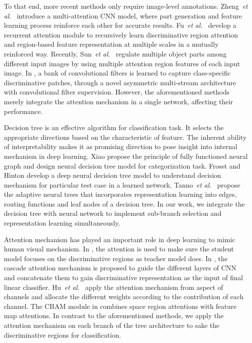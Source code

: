 \documentclass[10pt,twocolumn,letterpaper]{article}
\def\etal{{\em et al.}}
\begin{document}
{} To that end, more recent methods \cite{DBLP:conf/iccv/ZhengFML17,DBLP:conf/cvpr/FuZM17,DBLP:conf/eccv/SunYZD18,DBLP:conf/cvpr/WangMD18} only require image-level annotations. Zheng~\etal~\cite{DBLP:conf/iccv/ZhengFML17} introduce a multi-attention CNN model, where part generation and feature learning process reinforce each other for accurate results. Fu~\etal~\cite{DBLP:conf/cvpr/FuZM17} develop a recurrent attention module to recursively learn discriminative region attention and region-based feature representation at multiple scales in a mutually reinforced way. Recently, Sun~\etal~\cite{DBLP:conf/eccv/SunYZD18} regulate multiple object parts among different input images by using multiple attention region features of each input image. In \cite{DBLP:conf/cvpr/WangMD18}, a bank of convolutional filters is learned to capture class-specific discriminative patches, through a novel asymmetric multi-stream architecture with convolutional filter supervision. However, the aforementioned methods merely integrate the attention mechanism in a single network, affecting their performance.

{} Decision tree is an effective algorithm for classification task. It selects the appropriate directions based on the characteristic of feature. The inherent ability of interpretability makes it as promising direction to pose insight into internal mechanism in deep learning. Xiao \cite{DBLP:journals/corr/abs-1712-05934} propose the principle of fully functioned neural graph and design neural decision tree model for categorization task. Frosst and Hinton \cite{DBLP:journals/corr/abs-1711-09784} develop a deep neural decision tree model to understand decision mechanism for particular test case in a learned network. Tanno~\etal~\cite{DBLP:conf/icml/TannoAACN19} propose the adaptive neural trees that incorporates representation learning into edges, routing functions and leaf nodes of a decision tree. In our work, we integrate the decision tree with neural network to implement sub-branch selection and representation learning simultaneously.

{}
Attention mechanism has played an important role in deep learning to mimic human visual mechanism. In \cite{DBLP:journals/corr/ZagoruykoK16a}, the attention is used to make sure the student model focuses on the discriminative regions as teacher model does. In \cite{DBLP:journals/corr/abs-1804-02391}, the cascade attention mechanism is proposed to guide the different layers of CNN and concatenate them to gain discriminative representation as the input of final linear classifier. Hu~\etal~\cite{DBLP:conf/cvpr/HuSS18} apply the attention mechanism from aspect of channels and allocate the different weights according to the contribution of each channel. The CBAM module in \cite{DBLP:journals/corr/abs-1807-06521} combines space region attentions with feature map attentions. In contrast to the aforementioned methods, we apply the attention mechanism on each branch of the tree architecture to sake the discriminative regions for classification. 
\end{document}
